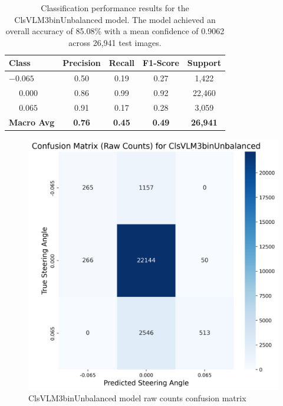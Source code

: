 \begin{table}[htbp]
\centering
\begin{tabular}{@{}lcccc@{}}
\toprule
\textbf{Class} & \textbf{Precision} & \textbf{Recall} & \textbf{F1-Score} & \textbf{Support} \\
\midrule
$-0.065$ & 0.50 & 0.19 & 0.27 & 1,422 \\
$\phantom{-}0.000$ & 0.86 & 0.99 & 0.92 & 22,460 \\
$\phantom{-}0.065$ & 0.91 & 0.17 & 0.28 & 3,059 \\
\midrule
\textbf{Macro Avg} & \textbf{0.76} & \textbf{0.45} & \textbf{0.49} & \textbf{26,941} \\
\bottomrule
\end{tabular}
\caption{Classification performance results for the ClsVLM3binUnbalanced model. The model achieved an overall accuracy of 85.08\% with a mean confidence of 0.9062 across 26,941 test images.}
\label{tab:clf_report_ClsVLM3binUnbalanced}
\end{table}

\begin{figure}[H]
\centering
\includegraphics[width=0.65\linewidth]{Figures/Results/cm_raw_ClsVLM3binUnbalanced.png}
\caption{ClsVLM3binUnbalanced model raw counts confusion matrix}
\label{fig:cm_raw_ClsVLM3binUnbalanced}
\end{figure}

